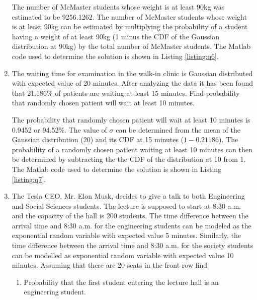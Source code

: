 \documentclass[12pt]{article}
\begin{document}
\begin{enumerate}
    The number of McMaster students whose weight is at least 90kg was estimated to be 9256.1262. The number of McMaster students whose weight is at least 90kg can be estimated by multiplying the probability of a student having a weight of at least 90kg (1 minus the CDF of the Gaussian distribution at 90kg) by the total number of McMaster students. The Matlab code used to determine the solution is shown in Listing \ref{listing:q6}.
    

    \item The waiting time for examination in the walk-in clinic is Gaussian distributed with expected value of 20 minutes. After analyzing the data it has been found that 21.186\% of patients are waiting at least 15 minutes. Find probability that randomly chosen patient will wait at least 10 minutes.

    The probability that randomly chosen patient will wait at least 10 minutes is 0.9452 or 94.52\%. The value of $\sigma$ can be determined from the mean of the Gaussian distribution (20) and its CDF at 15 minutes ($1-0.21186$). The probability of a randomly chosen patient waiting at least 10 minutes can then be determined by subtracting the the CDF of the distribution at 10 from 1. The Matlab code used to determine the solution is shown in Listing \ref{listing:q7}.
    

    \item The Tesla CEO, Mr. Elon Musk, decides to give a talk to both Engineering and Social Sciences students. The lecture is supposed to start at 8:30 a.m. and the capacity of the hall is 200 students. The time difference between the arrival time and 8:30 a.m. for the engineering students can be modeled as the exponential random variable with expected value 5 minutes. Similarly, the time difference between the arrival time and 8:30 a.m. for the society students  can be modelled as exponential random variable with expected value 10 minutes. Assuming that there are 20 seats in the front row find
    \begin{enumerate}
        \item Probability that the first student entering the lecture hall is an engineering student.


\end{enumerate}
\end{enumerate}
\end{document}
